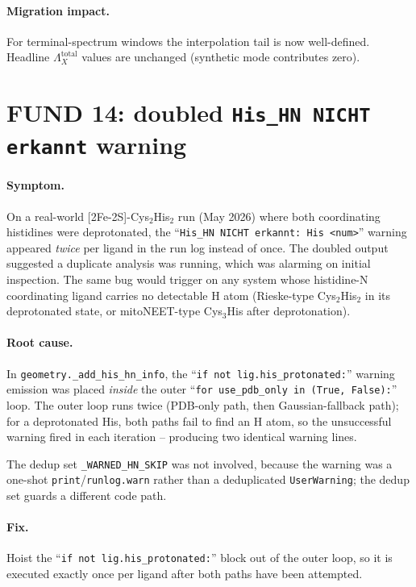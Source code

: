 \documentclass[10pt,a4paper,twoside]{article}
\newcommand{\fn}[1]{\texttt{#1}}
\begin{document}
\paragraph{Migration impact.}
For terminal-spectrum windows the interpolation tail is now
well-defined. Headline $\Lambda_X^\text{total}$ values are
unchanged (synthetic mode contributes zero).

\section{FUND 14: doubled \texttt{His\_HN NICHT erkannt} warning}
\label{sec:fund-14}

\paragraph{Symptom.}
On a real-world [2Fe-2S]-Cys$_2$His$_2$ run (May 2026) where both
coordinating histidines were deprotonated, the
``\texttt{His\_HN NICHT erkannt: His <num>}'' warning appeared
\emph{twice} per ligand in the run log instead of once. The doubled
output suggested a duplicate analysis was running, which was
alarming on initial inspection. The same bug would trigger on any
system whose histidine-N coordinating ligand carries no detectable
H atom (Rieske-type Cys$_2$His$_2$ in its deprotonated state, or
mitoNEET-type Cys$_3$His after deprotonation).

\paragraph{Root cause.}
In \fn{geometry.\_add\_his\_hn\_info}, the
``\texttt{if not lig.his\_protonated:}'' warning emission was
placed \emph{inside} the outer
``\texttt{for use\_pdb\_only in (True, False):}'' loop. The outer
loop runs twice (PDB-only path, then Gaussian-fallback path); for
a deprotonated His, both paths fail to find an H atom, so the
unsuccessful warning fired in each iteration -- producing two
identical warning lines.

The dedup set \fn{\_WARNED\_HN\_SKIP} was not involved, because
the warning was a one-shot \fn{print}/\fn{runlog.warn} rather
than a deduplicated \fn{UserWarning}; the dedup set guards a
different code path.

\paragraph{Fix.}
Hoist the ``\texttt{if not lig.his\_protonated:}'' block out of
the outer loop, so it is executed exactly once per ligand after
both paths have been attempted.
\end{document}
